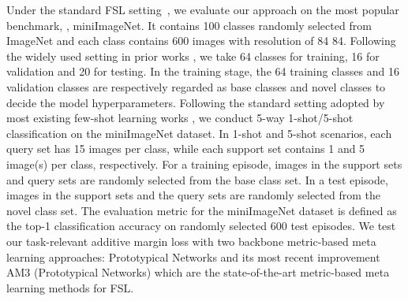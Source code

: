 \documentclass[10pt,twocolumn,letterpaper]{article}
\begin{document}
Under the standard FSL setting~\cite{Snell2017nips,vinyals2016bnips}, we evaluate our approach on the most popular benchmark, \ie,  miniImageNet. It contains 100 classes randomly selected from ImageNet \cite{Russakovsky2015ImageNet} and each class contains 600 images with resolution of 84  84. Following the widely used setting in prior works \cite{vinyals2016bnips,Snell2017nips}, we take 64 classes for training, 16 for validation and 20 for testing. In the training stage, the 64 training classes and 16 validation classes are respectively regarded as base classes and novel classes to decide the model hyperparameters. Following the standard setting adopted by most existing few-shot learning works \cite{vinyals2016bnips,Snell2017nips,Sung2018cvpr,Gidaris2018cvpr,Cai2018cvpr}, we conduct 5-way 1-shot/5-shot classification on the miniImageNet dataset. In 1-shot and 5-shot scenarios, each query set has 15 images per class, while each support set contains 1 and 5 image(s) per class, respectively. For a training episode, images in the support sets and query sets are randomly selected from the base class set. In a test episode, images in the support sets and the query sets are randomly selected from the novel class set. The evaluation metric for the miniImageNet dataset is defined as the top-1 classification accuracy on randomly selected 600 test episodes. We test our task-relevant additive margin loss with two backbone metric-based meta learning approaches:
Prototypical Networks \cite{Snell2017nips} and its most recent improvement AM3 (Prototypical Networks) \cite{Chen2019NIPS} which are the state-of-the-art  
metric-based meta learning methods for FSL. 
\end{document}
